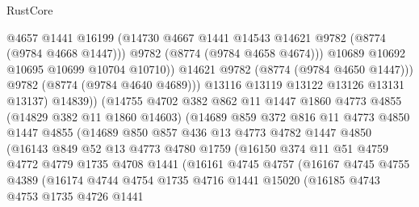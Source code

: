\begin{lexlean}{RustCore}
\begin{coremodule}
                            @4657
                            @1441
                            @16199
                            (@14730 @4667 @1441 @14543 @14621 @9782 (@8774 (@9784 @4668 @1447)))
                            @9782
                            (@8774 (@9784 @4658 @4674)))
                          @10689
                          @10692
                          @10695
                          @10699
                          @10704
                          @10710))
                      @14621
                      @9782
                      (@8774 (@9784 @4650 @1447)))
                    @9782
                    (@8774 (@9784 @4640 @4689)))
                  @13116
                  @13119
                  @13122
                  @13126
                  @13131
                  @13137)
                @14839))
            (@14755
              @4702
              @382
              @862
              @11
              @1447
              @1860
              @4773
              @4855
              (@14829 @382 @11 @1860 @14603)
              (@14689
                @859
                @372
                @816
                @11
                @4773
                @4850
                @1447
                @4855
                (@14689
                  @850
                  @857
                  @436
                  @13
                  @4773
                  @4782
                  @1447
                  @4850
                  (@16143
                    @849
                    @52
                    @13
                    @4773
                    @4780
                    @1759
                    (@16150
                      @374
                      @11
                      @51
                      @4759
                      @4772
                      @4779
                      @1735
                      @4708
                      @1441
                      (@16161
                        @4745
                        @4757
                        (@16167
                          @4745
                          @4755
                          @4389
                          (@16174
                            @4744
                            @4754
                            @1735
                            @4716
                            @1441
                            @15020
                            (@16185
                              @4743
                              @4753
                              @1735
                              @4726
                              @1441

\end{coremodule}
\end{lexlean}
